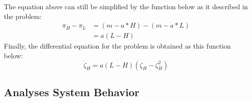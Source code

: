 \documentclass[a4paper, 12pt]{article}
\begin{document}
The equation above can still be simplified by the function below as it described in the problem: 
\vspace{-3mm}
\begin{equation}
\begin{split}
	\pi_{H} - \pi_{L} & =  (m - a*H)-(m-a*L) \\
	& = a(L - H)
\end{split}		
\end{equation}
Finally, the differential equation for the problem is obtained as this function below:
\vspace{-3mm}
\begin{equation}
	\dot\zeta_{H} = a(L-H)(\zeta_{H}-\zeta_{H}^{2})
\end{equation}

\subsection{Analyses System Behavior}
\end{document}
